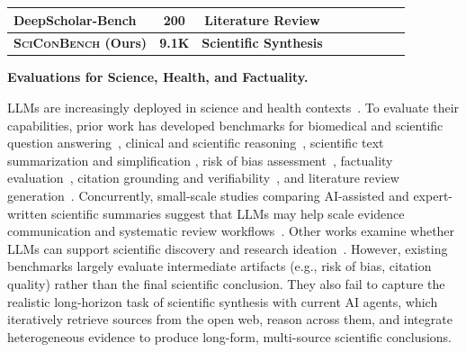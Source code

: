 \documentclass{article}
\newcommand{\xhdr}[1]{%
  \noindent\textbf{#1.}
}
\newcommand{\cmark}{\textcolor{green!60!black}{\ding{51}}}
\newcommand{\xmark}{\textcolor{red!70!black}{\ding{55}}}
\begin{document}
\begin{table}[t]
{\begin{tabular}{lcccccccc}
DeepScholar-Bench \cite{patel2025deepscholar}
& 200 
& Literature Review
& \cmark
& \cmark 
& \cmark 
& \cmark
& \cmark 
& \xmark \\

\midrule

\textbf{\textsc{SciConBench} (Ours)}
& \textbf{9.1K} 
& \textbf{Scientific Synthesis} 
& \cmark
& \cmark 
& \cmark 
& \cmark
& \cmark 
& \cmark \\

\bottomrule
\end{tabular}
}
\label{tab:related-work-comparison}
\end{table}





\xhdr{Evaluations for Science, Health, and Factuality} 
LLMs are increasingly deployed in science and health contexts~\cite{costa2026public, tang2023evaluating}. To evaluate their capabilities, prior work has developed benchmarks for biomedical and scientific question answering~\cite{dasigi-etal-2021-dataset, jin-etal-2019-pubmedqa, vladika-etal-2024-medreqal}, clinical and scientific reasoning~\cite{10.5555/3618408.3619195, li2024mediq, sun-etal-2025-reasonmed}, scientific text summarization and simplification \cite{bakker-kamps-2024-cochrane, devaraj-etal-2021-paragraph, takeshita-etal-2024-aclsum}, risk of bias assessment~\cite{huang2025large, marshall-etal-2017-automating, https://doi.org/10.1002/cesm.70044, wang-etal-2025-measuring}, factuality evaluation~\cite{joseph-etal-2024-factpico, kaur-etal-2024-evaluating, kwiatkowski-etal-2019-natural, wadden-etal-2020-fact, wadden-etal-2022-scifact}, citation grounding and verifiability~\cite{funkquist-etal-2023-citebench, gao-etal-2023-enabling, liu-etal-2023-evaluating}, and literature review generation~\cite{antu2023using, cao2025automation, doi:10.1073/pnas.2411962122, mostafapour2024evaluating}. Concurrently, small-scale studies comparing AI-assisted and expert-written scientific summaries suggest that LLMs may help scale evidence communication and systematic review workflows~\cite{cadiente2024evaluating, DEVANE2025111894}. Other works examine whether LLMs can support scientific discovery and research ideation~\cite{gupta2025all, si2025ideation, si2024can}. However, existing benchmarks largely evaluate intermediate artifacts (e.g., risk of bias, citation quality) rather than the final scientific conclusion. They also fail to capture the realistic long-horizon task of scientific synthesis with current AI agents, which iteratively retrieve sources from the open web, reason across them, and integrate heterogeneous evidence to produce long-form, multi-source scientific conclusions.
\end{document}

